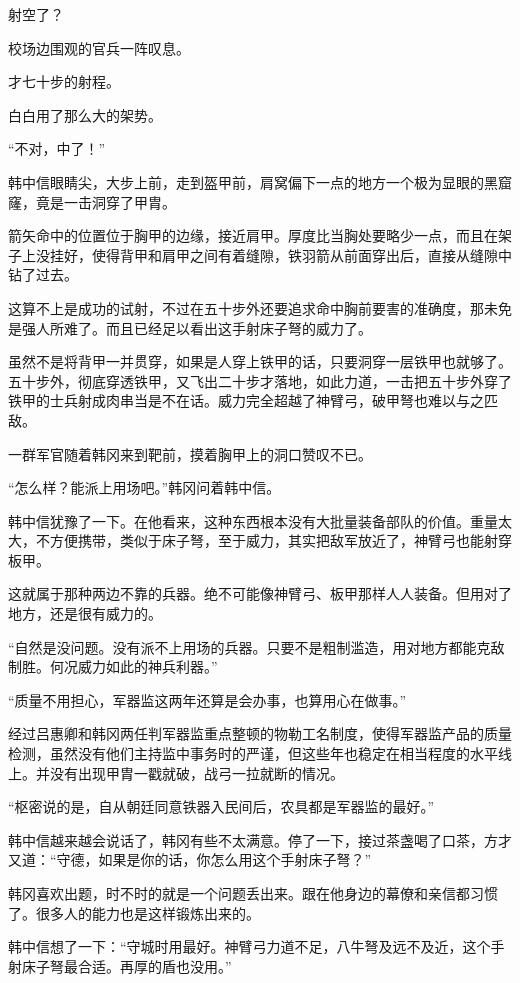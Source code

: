 射空了？

校场边围观的官兵一阵叹息。

才七十步的射程。

白白用了那么大的架势。

“不对，中了！”

韩中信眼睛尖，大步上前，走到盔甲前，肩窝偏下一点的地方一个极为显眼的黑窟窿，竟是一击洞穿了甲胄。

箭矢命中的位置位于胸甲的边缘，接近肩甲。厚度比当胸处要略少一点，而且在架子上没挂好，使得背甲和肩甲之间有着缝隙，铁羽箭从前面穿出后，直接从缝隙中钻了过去。

这算不上是成功的试射，不过在五十步外还要追求命中胸前要害的准确度，那未免是强人所难了。而且已经足以看出这手射床子弩的威力了。

虽然不是将背甲一并贯穿，如果是人穿上铁甲的话，只要洞穿一层铁甲也就够了。五十步外，彻底穿透铁甲，又飞出二十步才落地，如此力道，一击把五十步外穿了铁甲的士兵射成肉串当是不在话。威力完全超越了神臂弓，破甲弩也难以与之匹敌。

一群军官随着韩冈来到靶前，摸着胸甲上的洞口赞叹不已。

“怎么样？能派上用场吧。”韩冈问着韩中信。

韩中信犹豫了一下。在他看来，这种东西根本没有大批量装备部队的价值。重量太大，不方便携带，类似于床子弩，至于威力，其实把敌军放近了，神臂弓也能射穿板甲。

这就属于那种两边不靠的兵器。绝不可能像神臂弓、板甲那样人人装备。但用对了地方，还是很有威力的。

“自然是没问题。没有派不上用场的兵器。只要不是粗制滥造，用对地方都能克敌制胜。何况威力如此的神兵利器。”

“质量不用担心，军器监这两年还算是会办事，也算用心在做事。”

经过吕惠卿和韩冈两任判军器监重点整顿的物勒工名制度，使得军器监产品的质量检测，虽然没有他们主持监中事务时的严谨，但这些年也稳定在相当程度的水平线上。并没有出现甲胄一戳就破，战弓一拉就断的情况。

“枢密说的是，自从朝廷同意铁器入民间后，农具都是军器监的最好。”

韩中信越来越会说话了，韩冈有些不太满意。停了一下，接过茶盏喝了口茶，方才又道：“守德，如果是你的话，你怎么用这个手射床子弩？”

韩冈喜欢出题，时不时的就是一个问题丢出来。跟在他身边的幕僚和亲信都习惯了。很多人的能力也是这样锻炼出来的。

韩中信想了一下：“守城时用最好。神臂弓力道不足，八牛弩及远不及近，这个手射床子弩最合适。再厚的盾也没用。”

